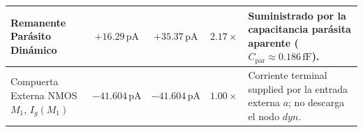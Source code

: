 \begin{table}[htbp]
\begin{tabularx}{\linewidth}{@{}>{\RaggedRight\arraybackslash}p{3.2cm} c c c >{\RaggedRight\arraybackslash}X@{}}
Remanente Parásito Dinámico & $+16.29\,\text{pA}$ & $+35.37\,\text{pA}$ & $2.17\times$ & Suministrado por la capacitancia parásita aparente ($C_{\text{par}} \approx 0.186\,\text{fF}$). \\
\midrule
Compuerta Externa NMOS $M_1$, $I_g(M_1)$ & $-41.604\,\text{pA}$ & $-41.604\,\text{pA}$ & $1.00\times$ & Corriente terminal supplied por la entrada externa $a$; no descarga el nodo $dyn$. \\
\bottomrule
\end{tabularx}
\end{table}
